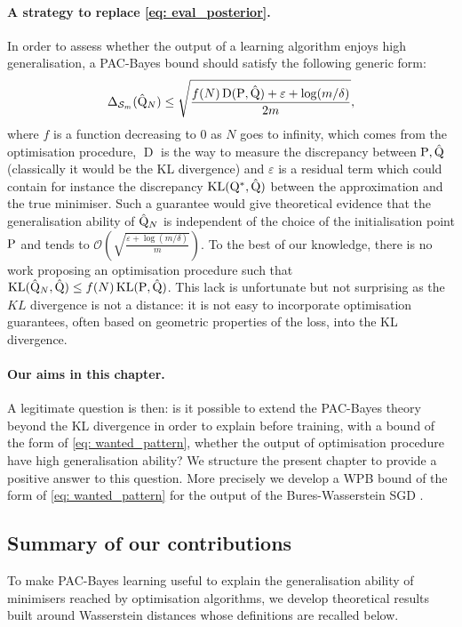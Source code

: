 \paragraph{A strategy to replace \eqref{eq: eval_posterior}.}
In order to assess whether the output of a learning algorithm enjoys high generalisation, a PAC-Bayes bound should satisfy the following generic form:
\begin{align}
\label{eq: wanted_pattern}
\Delta_{\Sm}(\hat{\Q}_N) \leq \sqrt{\frac{f(N)\operatorname{D}(\P,\hat{\Q}) + \varepsilon+ \log(m/\delta)}{2m}},
\end{align}
where $f$ is a function decreasing to $0$ as $N$ goes to infinity, which comes from the optimisation procedure, $\operatorname{D}$ is the way to measure the discrepancy between $\P,\hat{\Q}$ (classically it would be the KL divergence) and $\varepsilon$ is a residual term which could contain for instance the discrepancy $\operatorname{KL}(\Q^*,\hat{\Q})$ between the approximation and the true minimiser.
Such a guarantee would give theoretical evidence that the generalisation ability of $\hat{\Q}_N$ is independent of the choice of the initialisation point $\P$ and tends to $\mathcal{O}\left( \sqrt{\frac{\varepsilon + \log(m/\delta)}{m}} \right)$.
To the best of our knowledge, there is no work proposing an optimisation procedure such that $\operatorname{KL}(\hat{\Q}_N,\hat{\Q}) \leq f(N)  \operatorname{KL}(\P,\hat{\Q})$.  This lack is unfortunate but not surprising as the $KL$ divergence is not a distance: it is not easy to incorporate optimisation guarantees, often based on geometric properties of the loss, into the KL divergence.

\paragraph{Our aims in this chapter.}
A legitimate question is then: is it possible to extend the PAC-Bayes theory beyond the KL divergence in order to explain before training, with a bound of the form of \eqref{eq: wanted_pattern}, whether the output of optimisation procedure have high generalisation ability? We structure the present chapter to provide a positive answer to this question. More precisely we develop a WPB bound of the form of \eqref{eq: wanted_pattern} for the output of the Bures-Wasserstein SGD \citep{lambert2022variational}.



\subsection{Summary of our contributions}
\label{sec: intro_contrib}
To make PAC-Bayes learning useful to explain the generalisation ability of minimisers reached by optimisation algorithms, we develop theoretical results built around Wasserstein distances whose definitions are recalled below.

